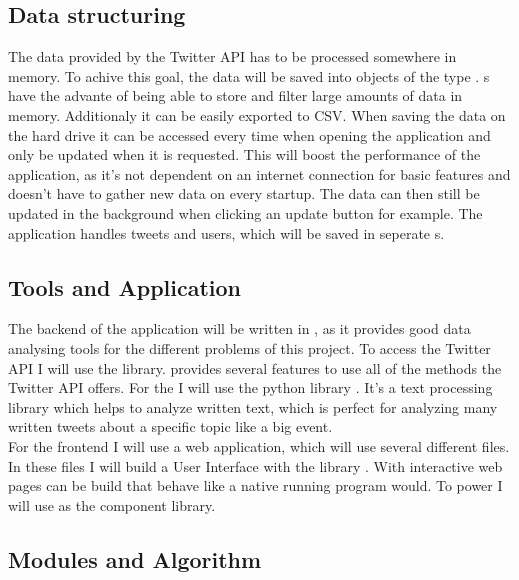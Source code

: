 \documentclass[a4paper,oneside,11pt]{scrreprt}
\begin{document}
\subsection{Data structuring}

The data provided by the Twitter API has to be processed somewhere in memory. To achive this goal, the data will be saved into objects of the  type . s have the advante of being able to store and filter large amounts of data in memory. Additionaly it can be easily exported to CSV. When saving the data on the hard drive it can be accessed every time when opening the application and only be updated when it is requested. This will boost the performance of the application, as it's not dependent on an internet connection for basic features and doesn't have to gather new data on every startup. The data can then still be updated in the background when clicking an update button for example. The application handles tweets and users, which will be saved in seperate s.

\subsection{Tools and Application}

The backend of the application will be written in , as it provides good data analysing tools for the different problems of this project. To access the Twitter API I will use the  library.  provides several features to use all of the methods the Twitter API offers. For the  I will use the python library . It's a text processing library which helps to analyze written text, which is perfect for analyzing many written tweets about a specific topic like a big event.\\

For the frontend I will use a web application, which will use several different  files. In these files I will build a User Interface with the library . With  interactive web pages can be build that behave like a native running program would. To power  I will use  as the component library.

\subsection{Modules and Algorithm}
\end{document}
